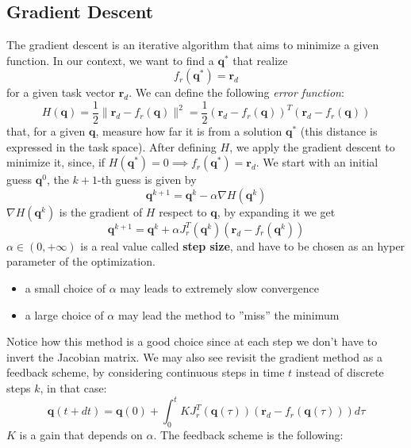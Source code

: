 \documentclass[10pt, letterpaper]{report}
\begin{document}
\subsection{Gradient Descent}
The gradient descent is an iterative algorithm that aims to minimize a given function. In our context, we want to find a $\mathbf q^*$ that realize\begin{equation}
    f_r(\mathbf q^*)=\mathbf r_d 
\end{equation}
for a given task vector $\mathbf r_d$. We can define the following \textit{error function}:\begin{equation}
    H(\mathbf q)=\frac{1}{2}\| \mathbf r_d-f_r(\mathbf q) \|^2=\frac{1}{2}(\mathbf r_d-f_r(\mathbf q))^T(\mathbf r_d-f_r(\mathbf q))
\end{equation}
that, for a given $\mathbf q$, measure how far it is from a solution $\mathbf q^*$ (this distance is expressed in the task space). After defining $H$, we apply the gradient descent to minimize it, since, if $H(\mathbf q^*)=0\implies f_r(\mathbf q^*)=\mathbf r_d$. We start with an initial guess $\mathbf q^0$, the $k+1$-th guess is given by
\begin{equation}
     \mathbf q^{k+1}=\mathbf q^k-\alpha\nabla H(\mathbf q^k)
\end{equation}
$\nabla H(\mathbf q^k)$ is the gradient of $H$ respect to $\mathbf q$, by expanding it we get
\begin{equation}
    \mathbf q^{k+1}=\mathbf q^k+\alpha J_r^T(\mathbf q^k)(\mathbf r_d-f_r(\mathbf q^k))
\end{equation}
$\alpha\in (0,+\infty)$ is a real value called \textbf{step size}, and have to be chosen as an hyper parameter of the optimization. \begin{itemize}
    \item a small choice of $\alpha$ may leads to extremely slow convergence 
    \item a large choice of $\alpha$ may lead the method to ''miss'' the minimum
\end{itemize}
Notice how this method is a good choice since at each step we don't have to invert the Jacobian matrix. We may also see revisit the gradient method as a feedback scheme, by considering continuous steps in time $t$ instead of discrete steps $k$, in that case:\begin{equation}
    \mathbf q(t+dt)=\mathbf q(0)+\int_0^t K J_r^T(\mathbf q(\tau))(\mathbf r_d-f_r(\mathbf q(\tau)))d\tau
\end{equation}
$K$ is a gain that depends on $\alpha$. The feedback scheme is the following:
\end{document}
